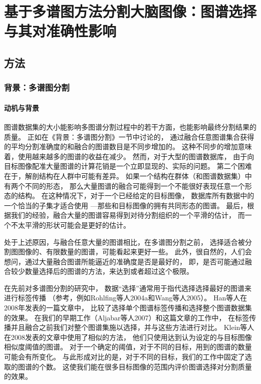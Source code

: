
\chapter*{基于多谱图方法分割大脑图像：图谱选择与其对准确性影响}
\section*{方法}
\subsection*{背景：多谱图分割}
\subsubsection*{动机与背景}
图谱数据集的大小能影响多图谱分割过程中的若干方面，也能影响最终分割结果的质量。
正如在《背景：多谱图分割》一节中讨论的，
通过融合任意图谱集合获得的平均分割准确度的和融合的图谱数目是不同步增加的。
这种不同步的增加意味着，使用越来越多的图谱的收益在减少。
然而，对于大型的图谱数据库，
由于向目标图像配准大量图谱的计算花销是一个立即显现的、实际的问题。
第二个困难在于，解剖结构在人群中可能有差异。
如果一个结构在群体（和图谱数据集）中有两个不同的形态，
那么大量图谱的融合可能得到一个不能很好表现任意一个形态的结构。
在这种情况下，对于一个已经给定的目标图像，
数据库所有数据中的一个恰当的子集才适合使用
---那些和目标图像的拥有共同形态的图谱。
最后，根据我们的经验，融合大量的图谱容易得到对待分割组织的一个平滑的估计，
而一个不太平滑的形状可能会是更好的估计。

处于上述原因，与融合任意大量的图谱相比，在多谱图分割之前，
选择适合被分割图图像的、有限数量的图谱，可能看起来更好一些。
此外，很自然的，人们会想问，通过大量融合图谱所能逼近的准确度是否是最好的，
即，是否可能通过融合较少数量选择后的图谱的方法，来达到或者超过这个极限。

在先前对多谱图分割的研究中，
数据``选择''通常用于指代选择选择最好的图谱来进行标签传播
（参考，例如Rohlfing等人2004a和Wang等人2005）。
Han等人在2008年发表的一篇文章中，
比较了选择单个图谱标签传播和选择整个图谱数据集的效果。
在我们的早期工作（Aljabar等人2007）和这篇文章的工作中，
在标签传播并且融合之前我们对整个图谱集施以选择，并与这些方法进行对比。
Klein等人在2008发表的文章中使用了相似的方法，
他们只使用达到认为设定的与目标图像相似度阈值的图谱。
对于一个确定的阈值，对于不同的目标，用到的图谱的数量可能会有所变化。
与此形成对比的是，对于不同的目标，我们的工作中固定了选取的图谱的个数。
这使我们能在很多目标图像的范围内评价图谱选择对分割质量的效果。

